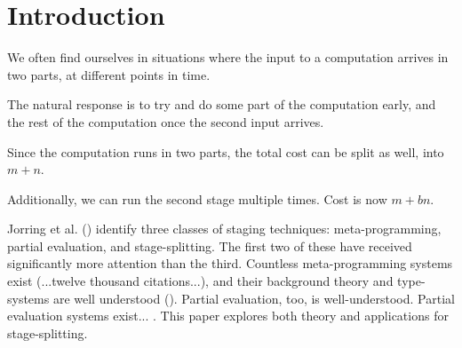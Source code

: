 \section{Introduction}

We often find ourselves in situations where the input to a computation arrives in two parts, at different points in time.  

The natural response is to try and do some part of the computation early, and the rest of the computation once the second input arrives.  

Since the computation runs in two parts, the total cost can be split as well, into $m+n$.

Additionally, we can run the second stage multiple times.  Cost is now $m+bn$.

Jorring et al. (\cite{jorring86}) identify three classes of staging techniques: meta-programming, partial evaluation, and stage-splitting.  The first two of these have received significantly more attention than the third.  Countless meta-programming systems exist (...twelve thousand citations...\cite{devito13}), and their background theory and type-systems are well understood (\cite{davies01}).  Partial evaluation, too, is well-understood.  Partial evaluation systems exist... . This paper explores both theory and applications for stage-splitting.  
